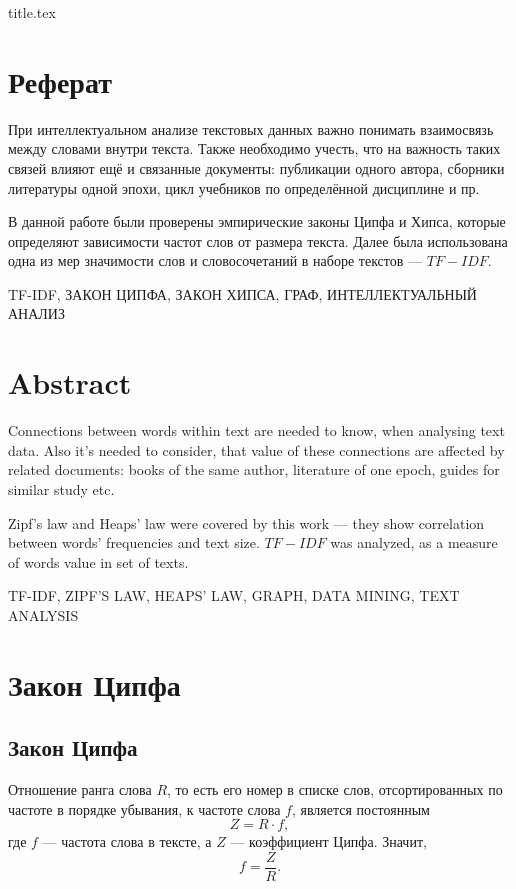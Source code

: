 



{title.tex}

\clearpage
\setcounter{page}{2}

\tableofcontents
\thispagestyle{empty}

\clearpage
\pagestyle{fancy}

\clearpage

\chapter*{Реферат}

При интеллектуальном анализе текстовых данных важно понимать взаимосвязь между
словами внутри текста.
Также необходимо учесть, что на важность таких связей влияют ещё и связанные
документы: публикации одного автора, сборники литературы одной эпохи,
цикл учебников по определённой дисциплине и пр.

В данной работе были проверены эмпирические законы Ципфа и Хипса,
которые определяют зависимости частот слов от размера текста.
Далее была использована одна из мер значимости слов и словосочетаний в наборе
текстов --- $TF-IDF$.

\MakeUppercase{TF-IDF, закон Ципфа, закон Хипса, граф, интеллектуальный анализ}
\clearpage

\chapter*{Abstract}

Connections between words within text are needed to know, when analysing text
data.
Also it's needed to consider, that value of these connections are affected
by related documents: books of the same author, literature of one epoch,
guides for similar study etc.

Zipf's law and Heaps' law were covered by this work --- they show
correlation between words' frequencies and text size.
$TF-IDF$ was analyzed, as a measure of words value in set of texts.

\MakeUppercase{TF-IDF, Zipf's law, Heaps' law, graph, data mining,
text analysis}

\chapter{Закон Ципфа}

\section{Закон Ципфа}
Отношение ранга слова $R$, то есть его номер в списке слов,
отсортированных по частоте в порядке убывания, к частоте слова $f$,
является постоянным \cite{JeanBaptiste}
\begin{equation*}
  Z = R \cdot f,
\end{equation*}
где $f$ --- частота слова в тексте, а $Z$ --- коэффициент Ципфа.
Значит,
\begin{equation*}
  f = \frac{Z}{R}.
\end{equation*}

